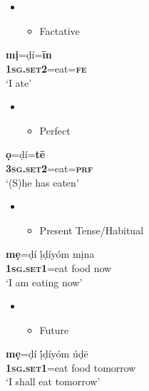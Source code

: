 \chapter[]{}
\label{bkm:Ref448083852}\setcounter{itemize}{0}
\begin{itemize}
\item \setcounter{itemize}{0}
\begin{itemize}
\item \begin{stylelsEnumerated}
Factative
\end{stylelsEnumerated}
\end{itemize}
\end{itemize}
\gll \textbf{mị}=ḍí=\textbf{\={i}n}\\
     \textbf{\textsc{1sg.set2}}=eat=\textbf{\textsc{fe}}\\
\glt ‘I ate’ \citep[44]{Kari1997}
\z

\begin{itemize}
\item \setcounter{itemize}{0}
\begin{itemize}
\item \begin{stylelsEnumerated}
Perfect
\end{stylelsEnumerated}
\end{itemize}
\end{itemize}
\gll \textbf{ọ}=ḍí=\textbf{t\={e}}\\
     \textbf{\textsc{3sg.set2}}=eat=\textbf{\textsc{prf}}\\
\glt ‘(S)he has eaten’ \citep[284]{Kari2004}
\z

\begin{itemize}
\item \setcounter{itemize}{0}
\begin{itemize}
\item \begin{stylelsEnumerated}
Present Tense/Habitual
\end{stylelsEnumerated}
\end{itemize}
\end{itemize}
\gll \textbf{mẹ}=ḍí     ị́ḍíyóm   mịna\\
     \textbf{\textsc{1sg.set1}}=eat   food   now\\
\glt ‘I am eating now’ \citep[45]{Kari1997}
\z

\begin{itemize}
\item \setcounter{itemize}{0}
\begin{itemize}
\item \begin{stylelsEnumerated}
Future
\end{stylelsEnumerated}
\end{itemize}
\end{itemize}
\gll \textbf{mẹ}=ḍí     ị́ḍíyóm   úḍ\={e}\\
     \textbf{\textsc{1sg.set1}}=eat   food   tomorrow\\
\glt ‘I shall eat tomorrow’ \citep[45]{Kari1997}
\z

